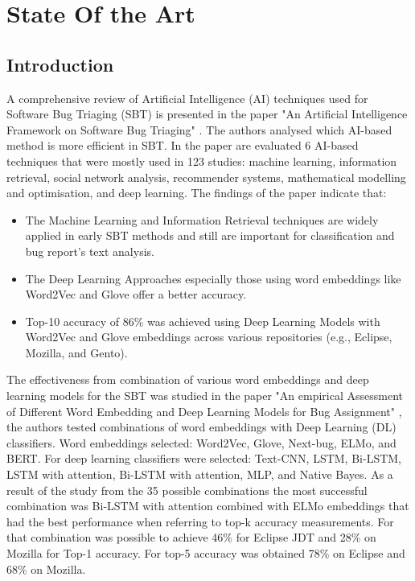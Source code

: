 
%

\chapter{State Of the Art}
\label{cha:users_manual}


\section{Introduction}
\label{sec:introduction}


		A comprehensive review of Artificial Intelligence (AI) techniques used for Software Bug Triaging (SBT) is presented in the paper "An Artificial Intelligence Framework on Software Bug Triaging" \cite{Nagwani2023} . The authors analysed which AI-based method is more efficient in SBT. In the paper are evaluated 6 AI-based techniques that were mostly used in 123 studies: machine learning, information retrieval, social network analysis, recommender systems, mathematical modelling and optimisation, and deep learning. The findings of the paper indicate that:
	\begin{itemize}
		\item The Machine Learning and Information Retrieval techniques are widely applied in early SBT methods and still are important for classification and bug report's text analysis.
		\item The Deep Learning Approaches especially those using word embeddings like Word2Vec and Glove offer a better accuracy. 
		\item Top-10 accuracy of 86\% was achieved using Deep Learning Models with Word2Vec and Glove embeddings across various repositories (e.g., Eclipse, Mozilla, and Gento). 
	\end{itemize}
	
		The effectiveness from combination of various word embeddings and deep learning models for the SBT was studied in the paper "An empirical Assessment of Different Word Embedding and Deep Learning Models for Bug Assignment" \cite{Huang2024}, the authors tested combinations of word embeddings with Deep Learning (DL) classifiers. Word embeddings selected: Word2Vec, Glove, Next-bug, ELMo, and BERT. For deep learning classifiers were selected: Text-CNN, LSTM, Bi-LSTM, LSTM with attention, Bi-LSTM with attention, MLP, and Native Bayes. As a result of the study from the 35 possible combinations the most successful combination was Bi-LSTM with attention combined with ELMo embeddings that had the best performance when referring to top-k accuracy measurements. For that combination was possible to achieve 46\% for Eclipse JDT and 28\% on Mozilla for Top-1 accuracy. For top-5 accuracy was obtained 78\% on Eclipse and 68\% on Mozilla. 
 
